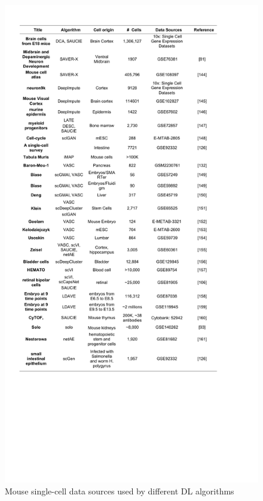 \documentclass[
]{book}
\begin{document}
\begin{figure}

{\centering \includegraphics[width=19.03in]{Table/Table2c} 

}

\caption{Mouse single-cell data sources used by different DL algorithms}\label{fig:Table2c}
\end{figure}
\end{document}
